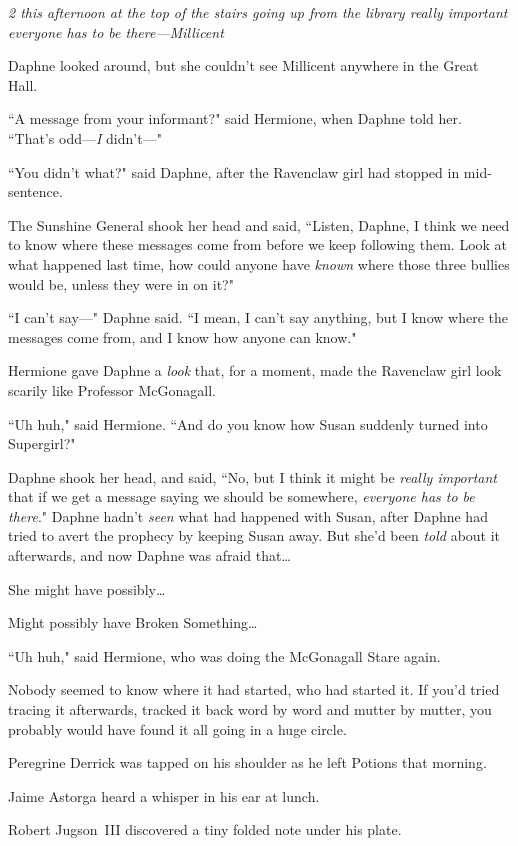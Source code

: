 \emph{2 this afternoon at the top of the stairs going up from the library \emph{really important} everyone has to be there—Millicent}

Daphne looked around, but she couldn't see Millicent anywhere in the Great Hall.

``A message from your informant?" said Hermione, when Daphne told her. ``That's odd—\emph{I} didn't—"

``You didn't what?" said Daphne, after the Ravenclaw girl had stopped in mid-sentence.

The Sunshine General shook her head and said, ``Listen, Daphne, I think we need to know where these messages come from before we keep following them. Look at what happened last time, how could anyone have \emph{known} where those three bullies would be, unless they were in on it?"

``I can't say—" Daphne said. ``I mean, I can't say anything, but I know where the messages come from, and I know how anyone can know."

Hermione gave Daphne a \emph{look} that, for a moment, made the Ravenclaw girl look scarily like Professor McGonagall.

``Uh huh," said Hermione. ``And do you know how Susan suddenly turned into Supergirl?"

Daphne shook her head, and said, ``No, but I think it might be \emph{really important} that if we get a message saying we should be somewhere, \emph{everyone has to be there}." Daphne hadn't \emph{seen} what had happened with Susan, after Daphne had tried to avert the prophecy by keeping Susan away. But she'd been \emph{told} about it afterwards, and now Daphne was afraid that{\ldots}

She might have possibly{\ldots}

Might possibly have Broken Something{\ldots}

``Uh huh," said Hermione, who was doing the McGonagall Stare again.

\later

Nobody seemed to know where it had started, who had started it. If you'd tried tracing it afterwards, tracked it back word by word and mutter by mutter, you probably would have found it all going in a huge circle.

Peregrine Derrick was tapped on his shoulder as he left Potions that morning.

Jaime Astorga heard a whisper in his ear at lunch.

Robert Jugson~III discovered a tiny folded note under his plate.

